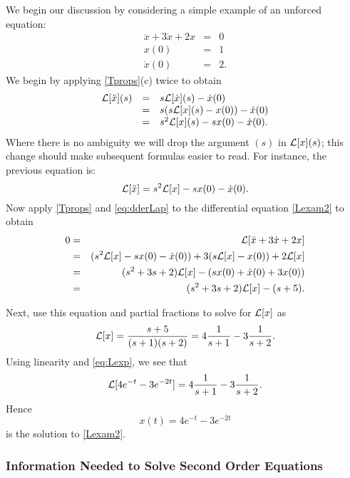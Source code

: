 \documentclass{ximera}
\begin{document}
We begin our discussion by considering a simple example of an unforced 
equation:
\begin{equation}  \label{Lexam2}
\begin{array}{rcl}
\ddot{x} + 3\dot{x} +2x & = & 0  \\
 x(0) & = & 1 \\
\dot{x}(0) & = & 2.
\end{array}
\end{equation}
We begin by applying \eqref{Tprops}(c) twice to obtain
\[
\begin{array}{rcl}
{\cal L}[\ddot{x}](s) & = & s{\cal L}[\dot{x}](s) - \dot{x}(0)\\
& = & s(s{\cal L}[x](s) - x(0)) - \dot{x}(0)\\
& = & s^2{\cal L}[x](s) - sx(0) - \dot{x}(0).
\end{array}
\]
Where there is no ambiguity we will drop the argument $(s)$ in 
${\cal L}[x](s)$; this change should make subsequent formulas easier 
to read.  For instance, the previous equation is:
\begin{equation}  \label{eq:dderLap}
{\cal L}[\ddot{x}] = s^2{\cal L}[x] - sx(0) - \dot{x}(0).
\end{equation}
Now apply \eqref{Tprops} and \eqref{eq:dderLap} to the differential
equation \eqref{Lexam2} to obtain
\begin{eqnarray*}
0 & = & {\cal L}[\ddot{x} + 3\dot{x} +2x] \\
& = & (s^2{\cal L}[x] - sx(0) - \dot{x}(0)) + 
3(s{\cal L}[x] - x(0)) + 2{\cal L}[x]\\
& = & (s^2+3s+2){\cal L}[x] -(sx(0)+\dot{x}(0)+3x(0)) \\
& = & (s^2+3s+2){\cal L}[x] - (s+5).
\end{eqnarray*}

Next, use this equation and partial fractions to solve for ${\cal L}[x]$ as
\[
\displaystyle{\cal L}[x] = \frac{s+5}{(s+1)(s+2)} = 4\frac{1}{s+1} - 3\frac{1}{s+2}.
\]
Using linearity and \eqref{eq:Lexp}, we see that 
\[
{\cal L}[4e^{-t}-3e^{-2t}] = 4\frac{1}{s+1} - 3\frac{1}{s+2}.
\]
Hence
\[
x(t) = 4e^{-t}-3e^{-2t}
\]
is the solution to \eqref{Lexam2}.


\subsubsection*{Information Needed to Solve Second Order Equations}
\end{document}
